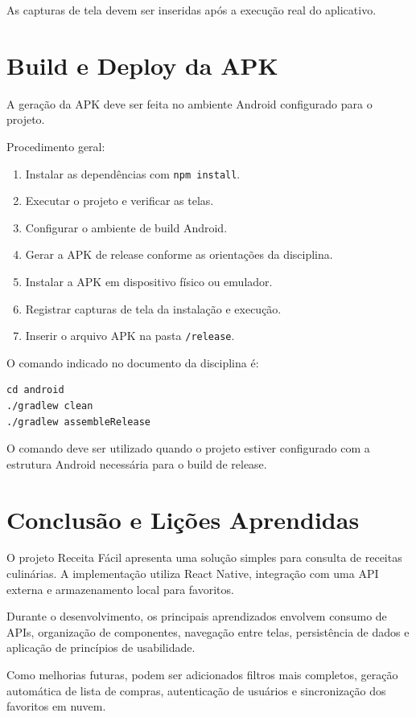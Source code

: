 \documentclass[12pt,a4paper]{article}
\begin{document}
As capturas de tela devem ser inseridas após a execução real do aplicativo.

\section{Build e Deploy da APK}

A geração da APK deve ser feita no ambiente Android configurado para o projeto.

Procedimento geral:

\begin{enumerate}
\item Instalar as dependências com \texttt{npm install}.
\item Executar o projeto e verificar as telas.
\item Configurar o ambiente de build Android.
\item Gerar a APK de release conforme as orientações da disciplina.
\item Instalar a APK em dispositivo físico ou emulador.
\item Registrar capturas de tela da instalação e execução.
\item Inserir o arquivo APK na pasta \texttt{/release}.
\end{enumerate}

O comando indicado no documento da disciplina é:

\begin{verbatim}
cd android
./gradlew clean
./gradlew assembleRelease
\end{verbatim}

O comando deve ser utilizado quando o projeto estiver configurado com a estrutura Android necessária para o build de release.

\section{Conclusão e Lições Aprendidas}

O projeto Receita Fácil apresenta uma solução simples para consulta de receitas culinárias. A implementação utiliza React Native, integração com uma API externa e armazenamento local para favoritos.

Durante o desenvolvimento, os principais aprendizados envolvem consumo de APIs, organização de componentes, navegação entre telas, persistência de dados e aplicação de princípios de usabilidade.

Como melhorias futuras, podem ser adicionados filtros mais completos, geração automática de lista de compras, autenticação de usuários e sincronização dos favoritos em nuvem.
\end{document}
